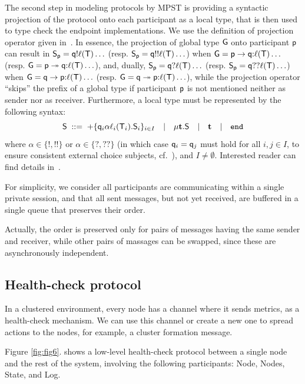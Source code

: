 The second step in modeling protocols by MPST is providing a syntactic projection of the protocol onto each participant as a local type, that is then used to
type check the endpoint implementations.  
We use the definition of projection operator given in~\cite[Figure \ref{fig:fig2}]{HuY17}. 
In essence, the projection of global type ${\sf G}$ onto participant ${\sf p}$ can result in 
${\mathsf S}_{\sf p}={\sf q}{!}\ell({\mathsf T})\ldots$ (resp. ${\mathsf S}_{\sf p}={\sf q}{!!}\ell({\mathsf T})\ldots$) 
when ${\sf G}={\sf p}\to{\sf q}{:}\ell({\mathsf T})\ldots$ (resp. ${\sf G}={\sf p}\twoheadrightarrow{\sf q}{:}\ell({\mathsf T})\ldots$), 
and, dually, ${\mathsf S}_{\sf p}={\sf q}{?}\ell({\mathsf T})\ldots$ (resp. ${\mathsf S}_{\sf p}={\sf q}{??}\ell({\mathsf T})\ldots$) when ${\sf G}={\sf q}\to{\sf p}{:}\ell({\mathsf T})\ldots$ 
(resp. ${\sf G}={\sf q}\twoheadrightarrow{\sf p}{:}\ell({\mathsf T})\ldots$), 
while the projection operator ``skips'' the prefix of a global type if participant ${\sf p}$ is not mentioned neither as sender nor as receiver. Furthermore, a local type must be represented by the following syntax:\\
\[
{\mathsf S} \; ::= \; 
{+}\{{\sf q}_i\alpha\ell_i({\mathsf T}_i).{\mathsf S}_i\}_{i\in I}  \quad | \quad 
\mu \textbf{t}.{\mathsf S} \quad | \quad 
\textbf{t} \quad | \quad
\mathtt{end}
\]
where $\alpha\in\{{!}, {!!}\}$ or  $\alpha\in\{{?}, {??}\}$ (in which case ${\sf q}_i={\sf q}_j$ must hold for all $i,j \in I$, to ensure consistent external choice subjects, cf.~\cite[Page 6.]{HuY17}), and $I\not=\emptyset$.
Interested reader can find details in~\cite{HuY17}.

For simplicity, we consider all participants are communicating within a single private session, and that all sent messages, but not yet received, are buffered in a single queue that preserves their order. 

Actually, the order is preserved only for pairs of messages having the same sender and receiver, while other pairs of massages can be swapped, since these are asynchronously independent.
%
%
\subsection{Health-check protocol}\label{sec:health_check_protocol}
%
In a clustered environment, every node has a channel where it sends metrics, as a health-check mechanism. We can use this channel or create a new one to spread actions to the nodes, for example, a cluster formation message. 

Figure \ref{fig:fig6}. shows a low-level health-check protocol between a single node and the rest of the system, involving the following participants: Node, Nodes, State, and Log.

